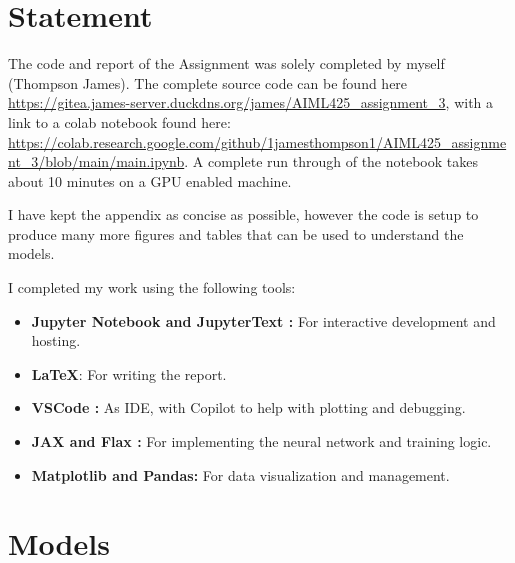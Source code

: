 \documentclass[conference,a4paper]{IEEEtran}
\begin{document}
\newpage
\section*{Statement}

The code and report of the Assignment was solely completed by myself (Thompson James). The complete source code can be found here \url{https://gitea.james-server.duckdns.org/james/AIML425\_assignment\_3}, with a link to a colab notebook found here: \url{https://colab.research.google.com/github/1jamesthompson1/AIML425_assignment_3/blob/main/main.ipynb}. A complete run through of the notebook takes about 10 minutes on a GPU enabled machine.

I have kept the appendix as concise as possible, however the code is setup to produce many more figures and tables that can be used to understand the models.

I completed my work using the following tools:
\begin{itemize}
    \item \textbf{Jupyter Notebook \cite{Kluyver2016jupyter} and JupyterText \cite{woutsMwoutsJupytext2025}:} For interactive development and hosting.
    \item \textbf{\LaTeX}: For writing the report.
    \item \textbf{VSCode \cite{MicrosoftVscode2025}:} As IDE, with Copilot to help with plotting and debugging.
    \item \textbf{JAX \cite{jax2018github} and Flax \cite{flax2020github}:} For implementing the neural network and training logic.
    \item \textbf{Matplotlib\cite{Hunter:2007} and Pandas\cite{thepandasdevelopmentteamPandasdevPandasPandas}:} For data visualization and management.
\end{itemize}





\appendix

\section{Models}
\end{document}
